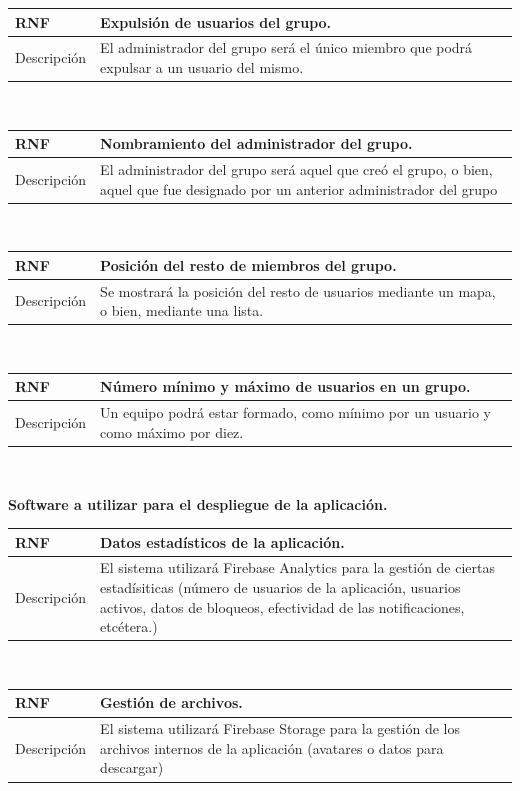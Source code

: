 \documentclass[twoside]{report}
\newcommand\addrow[2]{#1 &#2\\ }
\newcommand\addheading[2]{#1 &#2\\ \hline}
\newcommand\tabularhead{\begin{tabular}{lp{0.7\textwidth}}
\hline
}
\newenvironment{req}{\tabularhead}
{\hline\end{tabular}}
\begin{document}
\begin{req}
	\addheading{\textbf{RNF\arabic{nonFunctionalRequirements}}}{Expulsión de usuarios del grupo.}
	\addrow{Descripción}{El administrador del grupo será el único miembro que podrá expulsar a un usuario del mismo.}
\end{req}\\

\begin{req}
	\addheading{\textbf{RNF\arabic{nonFunctionalRequirements}}}{Nombramiento del administrador del grupo.}
	\addrow{Descripción}{El administrador del grupo será aquel que creó el grupo, o bien, aquel que fue designado por un anterior administrador del grupo}
\end{req}\\

\begin{req}
	\addheading{\textbf{RNF\arabic{nonFunctionalRequirements}}}{Posición del resto de miembros del grupo.}
	\addrow{Descripción}{Se mostrará la posición del resto de usuarios mediante un mapa, o bien, mediante una lista.}
\end{req}\\

\begin{req}
	\addheading{\textbf{RNF\arabic{nonFunctionalRequirements}}}{Número mínimo y máximo de usuarios en un grupo.}
	\addrow{Descripción}{Un equipo podrá estar formado, como mínimo por un usuario y como máximo por diez.}
\end{req}\\

\textbf{Software a utilizar para el despliegue de la aplicación.}\\

\begin{req}
	\addheading{\textbf{RNF\arabic{nonFunctionalRequirements}}}{Datos estadísticos de la aplicación.}
	\addrow{Descripción}{El sistema utilizará Firebase Analytics para la gestión de ciertas estadísiticas (número de usuarios de la aplicación, usuarios activos, datos de bloqueos, efectividad de las notificaciones, etcétera.)}
\end{req}\\

\begin{req}
	\addheading{\textbf{RNF\arabic{nonFunctionalRequirements}}}{Gestión de archivos.}
	\addrow{Descripción}{El sistema utilizará Firebase Storage para la gestión de los archivos internos de la aplicación (avatares o datos para descargar)}
\end{req}\\
\end{document}
